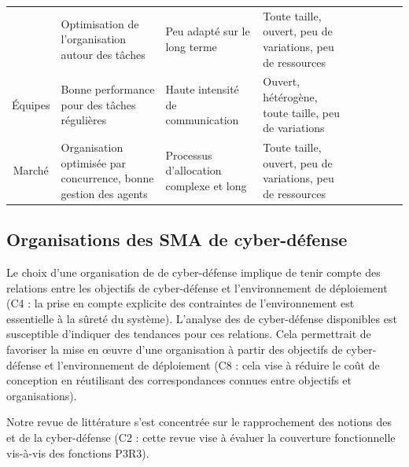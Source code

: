 \begin{table}[t!]
{\begin{tabularx}{\linewidth}
      { Coalition}
       & {  Optimisation de l'organisation autour des tâches}
       & {  Peu adapté sur le long terme}
       & {  Toute taille, ouvert, peu de variations, peu de ressources}
       & {  \cite{carvalho2011evolutionary}}
      \\

      { Équipes}
       & {  Bonne performance pour des tâches régulières}
       & {  Haute intensité de communication}
       & {  Ouvert, hétérogène, toute taille, peu de variations}
       & {  \cite{akandwanaho2018generic}}
      \\

      { Marché}
       & {  Organisation optimisée par concurrence, bonne gestion des agents}
       & {  Processus d'allocation complexe et long}
       & {  Toute taille, ouvert, peu de variations, peu de ressources}
       & {  \cite{demir2021adaptive}}
      \\
      \bottomrule
    \end{tabularx}
  }
  \label{tab:general-overview}
\end{table}


\subsection{Organisations des SMA de cyber-défense}


Le choix d'une organisation de  de cyber-défense implique de tenir compte des relations entre les objectifs de cyber-défense et l'environnement de déploiement (C4 : la prise en compte explicite des contraintes de l’environnement est essentielle à la sûreté du système).
L'analyse des  de cyber-défense disponibles est susceptible d'indiquer des tendances pour ces relations.
Cela permettrait de favoriser la mise en œuvre d'une organisation à partir des objectifs de cyber-défense et l'environnement de déploiement (C8 : cela vise à réduire le coût de conception en réutilisant des correspondances connues entre objectifs et organisations).

Notre revue de littérature s'est concentrée sur le rapprochement des notions des  et de la cyber-défense (C2 : cette revue vise à évaluer la couverture fonctionnelle vis-à-vis des fonctions P3R3).

